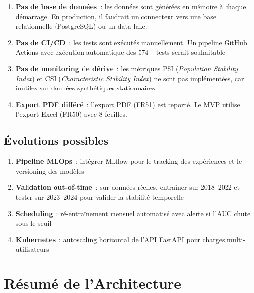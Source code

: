 \documentclass[12pt,a4paper]{article}
\begin{document}
\begin{enumerate}
    \item \textbf{Pas de base de donn\'ees}~: les donn\'ees sont g\'en\'er\'ees en m\'emoire \`a chaque d\'emarrage. En production, il faudrait un connecteur vers une base relationnelle (PostgreSQL) ou un data lake.

    \item \textbf{Pas de CI/CD}~: les tests sont ex\'ecut\'es manuellement. Un pipeline GitHub Actions avec ex\'ecution automatique des 574+ tests serait souhaitable.

    \item \textbf{Pas de monitoring de d\'erive}~: les m\'etriques PSI (\textit{Population Stability Index}) et CSI (\textit{Characteristic Stability Index}) ne sont pas impl\'ement\'ees, car inutiles sur donn\'ees synth\'etiques stationnaires.

    \item \textbf{Export PDF diff\'er\'e}~: l'export PDF (FR51) est report\'e. Le MVP utilise l'export Excel (FR50) avec 8 feuilles.
\end{enumerate}

\subsection{\'Evolutions possibles}

\begin{enumerate}
    \item \textbf{Pipeline MLOps}~: int\'egrer MLflow pour le tracking des exp\'eriences et le versioning des mod\`eles

    \item \textbf{Validation out-of-time}~: sur donn\'ees r\'eelles, entra\^iner sur 2018--2022 et tester sur 2023--2024 pour valider la stabilit\'e temporelle

    \item \textbf{Scheduling}~: r\'e-entra\^inement mensuel automatis\'e avec alerte si l'AUC chute sous le seuil

    \item \textbf{Kubernetes}~: autoscaling horizontal de l'API FastAPI pour charges multi-utilisateurs
\end{enumerate}


\section{R\'esum\'e de l'Architecture}
\end{document}
